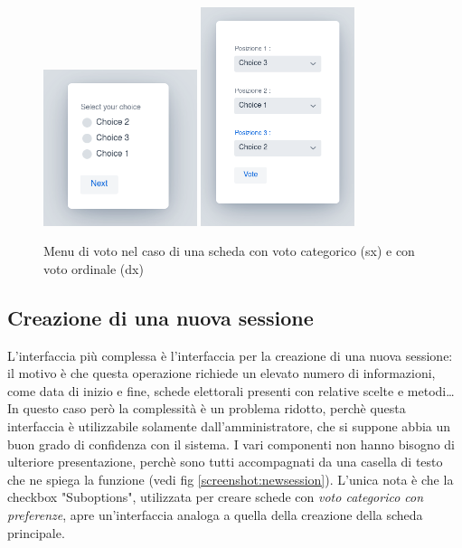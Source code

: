 \begin{figure}
	\centering
	\includegraphics[width=0.4\textwidth]{img/gui/categoricalVoting.png}
	\includegraphics[width=0.4\textwidth]{img/gui/OrdinalVoting.png}
	\caption{Menu di voto nel caso di una scheda con voto categorico (sx) e con voto ordinale (dx)}
	\label{screenshot:vote}
\end{figure}

\subsection{Creazione di una nuova sessione}
L'interfaccia più complessa è l'interfaccia per la creazione di una nuova sessione: il motivo è che questa operazione richiede un elevato numero di informazioni, come data di inizio e fine, schede elettorali presenti con relative scelte e metodi\ldots 
In questo caso però la complessità è un problema ridotto, perchè questa interfaccia è utilizzabile solamente dall'amministratore, che si suppone abbia un buon grado di confidenza con il sistema.
I vari componenti non hanno bisogno di ulteriore presentazione, perchè sono tutti accompagnati da una casella di testo che ne spiega la funzione (vedi fig \ref{screenshot:newsession}). L'unica nota è che la checkbox "Suboptions", utilizzata per creare schede con \emph{voto categorico con preferenze}, apre un'interfaccia analoga a quella della creazione della scheda principale.

